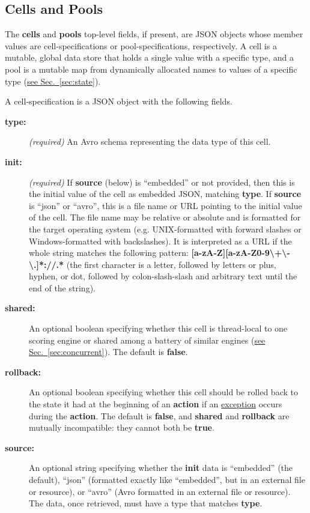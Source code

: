 \documentclass{article}
\newcommand{\PFAc}{\ttfamily\bfseries}
\newenvironment{allowedfields}%
  {\begin{center} \begin{minipage}{0.9\linewidth} \begin{description}}%
  {\end{description} \end{minipage} \end{center}}
\theoremstyle{definition}
\begin{document}
\hypertarget{hsec:cells-pools}{}
\subsection{Cells and Pools}
\label{sec:cells-pools}

The {\PFAc cells} and {\PFAc pools} top-level fields, if present, are JSON objects whose member values are cell-specifications or pool-specifications, respectively.  A cell is a mutable, global data store that holds a single value with a specific type, and a pool is a mutable map from dynamically allocated names to values of a specific type (\hyperlink{hsec:state}{see Sec.~\ref{sec:state}}).

A cell-specification is a JSON object with the following fields.
\begin{allowedfields}
\item[\PFAc type:] {\it (required)} An Avro schema representing the data type of this cell.
\item[\PFAc init:] {\it (required)} If {\PFAc source} (below) is ``embedded'' or not provided, then this is the initial value of the cell as embedded JSON, matching {\PFAc type}. If {\PFAc source} is ``json'' or ``avro'', this is a file name or URL pointing to the initial value of the cell. The file name may be relative or absolute and is formatted for the target operating system (e.g. UNIX-formatted with forward slashes or Windows-formatted with backslashes). It is interpreted as a URL if the whole string matches the following pattern: {\PFAc [a-zA-Z][a-zA-Z0-9\textbackslash+\textbackslash-\textbackslash.]*://.*} (the first character is a letter, followed by letters or plus, hyphen, or dot, followed by colon-slash-slash and arbitrary text until the end of the string).
\item[\PFAc shared:] An optional boolean specifying whether this cell is thread-local to one scoring engine or shared among a battery of similar engines (\hyperlink{hsec:concurrent}{see Sec.~\ref{sec:concurrent}}).  The default is {\PFAc false}.
\item[\PFAc rollback:] An optional boolean specifying whether this cell should be rolled back to the state it had at the beginning of an {\PFAc action} if an \hyperlink{hsec:exceptions}{exception} occurs during the {\PFAc action}.  The default is {\PFAc false}, and {\PFAc shared} and {\PFAc rollback} are mutually incompatible: they cannot both be {\PFAc true}.
\item[\PFAc source:] An optional string specifying whether the {\PFAc init} data is ``embedded'' (the default), ``json'' (formatted exactly like ``embedded'', but in an external file or resource), or ``avro'' (Avro formatted in an external file or resource). The data, once retrieved, must have a type that matches {\PFAc type}.
\end{allowedfields}
\end{document}
